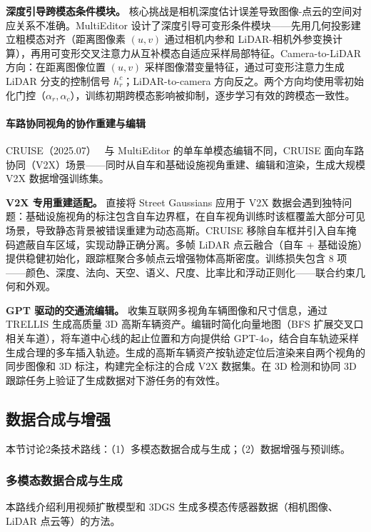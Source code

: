 \textbf{深度引导跨模态条件模块。} 核心挑战是相机深度估计误差导致图像-点云的空间对应关系不准确。MultiEditor 设计了深度引导可变形条件模块——先用几何投影建立粗模态对齐（距离图像素 $(u,v)$ 通过相机内参和 LiDAR-相机外参变换计算），再用可变形交叉注意力从互补模态自适应采样局部特征。Camera-to-LiDAR 方向：在距离图像位置 $(u,v)$ 采样图像潜变量特征，通过可变形注意力生成 LiDAR 分支的控制信号 $h_r^c$；LiDAR-to-camera 方向反之。两个方向均使用零初始化门控（$\alpha_r, \alpha_c$），训练初期跨模态影响被抑制，逐步学习有效的跨模态一致性。

\paragraph{车路协同视角的协作重建与编辑}

CRUISE（2025.07）~\cite{2507_18473} 与 MultiEditor 的单车单模态编辑不同，CRUISE 面向车路协同（V2X）场景——同时从自车和基础设施视角重建、编辑和渲染，生成大规模 V2X 数据增强训练集。

\textbf{V2X 专用重建适配。} 直接将 Street Gaussians 应用于 V2X 数据会遇到独特问题：基础设施视角的标注包含自车边界框，在自车视角训练时该框覆盖大部分可见场景，导致静态背景被错误重建为动态高斯。CRUISE 移除自车框并引入自车掩码遮蔽自车区域，实现动静正确分离。多帧 LiDAR 点云融合（自车 + 基础设施）提供稳健初始化，跟踪框聚合多帧点云增强物体高斯密度。训练损失包含 8 项——颜色、深度、法向、天空、语义、尺度、比率比和浮动正则化——联合约束几何和外观。

\textbf{GPT 驱动的交通流编辑。} 收集互联网多视角车辆图像和尺寸信息，通过 TRELLIS 生成高质量 3D 高斯车辆资产。编辑时简化向量地图（BFS 扩展交叉口相关车道），将车道中心线的起止位置和方向提供给 GPT-4o，结合自车轨迹采样生成合理的多车插入轨迹。生成的高斯车辆资产按轨迹定位后渲染来自两个视角的同步图像和 3D 标注，构建完全标注的合成 V2X 数据集。在 3D 检测和协同 3D 跟踪任务上验证了生成数据对下游任务的有效性。

\subsection{数据合成与增强}
\label{ss:18_3}

本节讨论2条技术路线：（1）多模态数据合成与生成；（2）数据增强与预训练。

\subsubsection{多模态数据合成与生成}

本路线介绍利用视频扩散模型和 3DGS 生成多模态传感器数据（相机图像、LiDAR 点云等）的方法。

